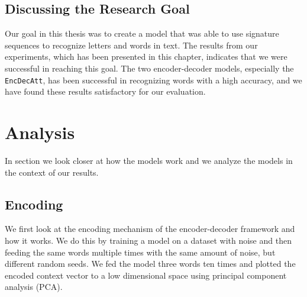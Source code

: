 \subsection{Discussing the Research Goal}
Our goal in this thesis was to create a model that was able to use signature sequences to recognize letters and words in text. The results from our experiments, which has been presented in this chapter, indicates that we were successful in reaching this goal. The two encoder-decoder models, especially the {\tt EncDecAtt}, has been successful in recognizing words with a high accuracy, and we have found these results satisfactory for our evaluation.


\section{Analysis}
\label{sec:reasoning}
In section we look closer at how the models work and we analyze the models in the context of our results.

\subsection{Encoding}
We first look at the encoding mechanism of the encoder-decoder framework and how it works. We do this by training a model on a dataset with noise and then feeding the same words multiple times with the same amount of noise, but different random seeds. We fed the model three words ten times and plotted the encoded context vector to a low dimensional space using principal component analysis (PCA). 

